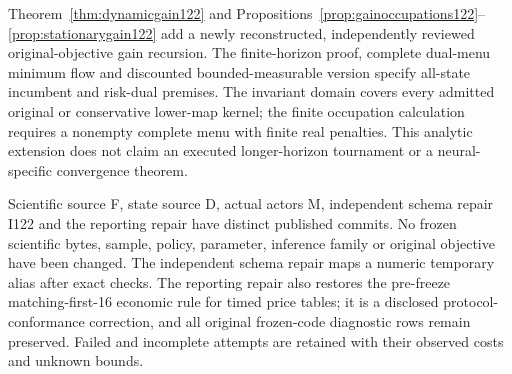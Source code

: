Theorem~\ref{thm:dynamicgain122} and Propositions~\ref{prop:gainoccupations122}--\ref{prop:stationarygain122} add a newly reconstructed, independently reviewed original-objective gain recursion. The finite-horizon proof, complete dual-menu minimum flow and discounted bounded-measurable version specify all-state incumbent and risk-dual premises. The invariant domain covers every admitted original or conservative lower-map kernel; the finite occupation calculation requires a nonempty complete menu with finite real penalties. This analytic extension does not claim an executed longer-horizon tournament or a neural-specific convergence theorem.

Scientific source F, state source D, actual actors M, independent schema repair I122 and the reporting repair have distinct published commits. No frozen scientific bytes, sample, policy, parameter, inference family or original objective have been changed. The independent schema repair maps a numeric temporary alias after exact checks. The reporting repair also restores the pre-freeze matching-first-16 economic rule for timed price tables; it is a disclosed protocol-conformance correction, and all original frozen-code diagnostic rows remain preserved. Failed and incomplete attempts are retained with their observed costs and unknown bounds.

